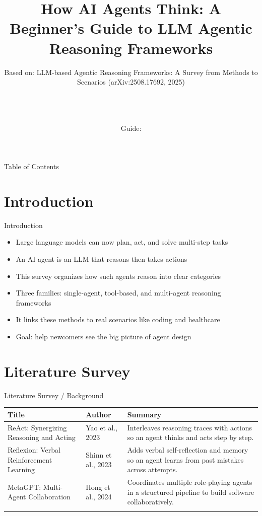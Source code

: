 \documentclass[10pt]{beamer}
\title[B.Tech Seminar]{How AI Agents Think: A Beginner's Guide to LLM Agentic Reasoning Frameworks}
\subtitle{Based on: LLM-based Agentic Reasoning Frameworks: A Survey from Methods to Scenarios (arXiv:2508.17692, 2025)}
\author[\studentname\ (\shortinst)]{\studentname \\ \small \rollno \\ \small \rollclass \\ \small Guide: \guidename}
\institute[]{\deptname \\ \collegename}
\date{\seminardate}
\begin{document}
\begin{frame}[plain]
  \titlepage
\end{frame}
\begin{frame}{Table of Contents}
  \tableofcontents
\end{frame}
\section{Introduction}
\begin{frame}{Introduction}
\begin{itemize}
  \item Large language models can now plan, act, and solve multi-step tasks
  \item An AI agent is an LLM that reasons then takes actions
  \item This survey organizes how such agents reason into clear categories
  \item Three families: single-agent, tool-based, and multi-agent reasoning frameworks
  \item It links these methods to real scenarios like coding and healthcare
  \item Goal: help newcomers see the big picture of agent design
\end{itemize}
\end{frame}
\section{Literature Survey}
\begin{frame}{Literature Survey / Background}
  \small
  \begin{tabular}{@{}p{2.7cm}p{2.3cm}p{5.6cm}@{}}
    \toprule
    \textbf{Title} & \textbf{Author} & \textbf{Summary} \\
    \midrule
    ReAct: Synergizing Reasoning and Acting & Yao et al., 2023 & Interleaves reasoning traces with actions so an agent thinks and acts step by step. \\
    \addlinespace
    Reflexion: Verbal Reinforcement Learning & Shinn et al., 2023 & Adds verbal self-reflection and memory so an agent learns from past mistakes across attempts. \\
    \addlinespace
    MetaGPT: Multi-Agent Collaboration & Hong et al., 2024 & Coordinates multiple role-playing agents in a structured pipeline to build software collaboratively. \\
    \addlinespace
    \bottomrule
  \end{tabular}
\end{frame}
\end{document}
